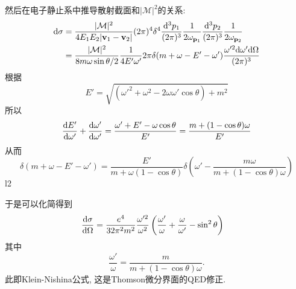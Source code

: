 \begin{example}[Campton散射]
    然后在电子静止系中推导散射截面和$|\mathcal M|^2$的关系:
    \begin{align}
        \d\sigma&=\frac{|\mathcal M|^2}{4E_1E_2|\vec v_1-\vec v_2|}\dpi4\delta^4\lips{p_1}\lips{p_2}\\
        &=\frac{|\mathcal M|^2}{8m\omega\sin\theta/2}\frac{1}{4E'\omega'}2\pi\delta(m+\omega-E'-\omega')\frac{\omega'^2\d\omega'\d\Omega}{\dpi3}
    \end{align}
    根据
    \begin{equation}
        E'=\sqrt{(\omega'^2+\omega^2-2\omega\omega'\cos\theta)+m^2}
    \end{equation}
    所以
    \begin{equation}
        \frac{\mathrm dE'}{\mathrm d\omega'}+\frac{\mathrm d\omega'}{\mathrm d\omega'}=\frac{\omega'+E'-\omega\cos\theta}{E'}=\frac{m+(1-\cos\theta)\omega}{E'}
    \end{equation}
    从而
    \begin{equation}
        \delta(m+\omega-E'-\omega')=\frac{E'}{m+\omega(1-\cos\theta)}\delta(\omega'-\frac{m\omega}{m+(1-\cos\theta)\omega})
    \end{equation}l2
     
    于是可以化简得到
    \begin{align}
        \frac{\mathrm d\sigma}{\mathrm d\Omega}&=\frac{e^4}{32\pi^2m^2}\frac{\omega'^2}{\omega^2}\left(\frac{\omega'}{\omega}+\frac{\omega}{\omega'}-\sin^2\theta\right)
    \end{align}
    其中
    \begin{equation}
        \frac{\omega'}{\omega}=\frac{m}{m+(1-\cos\theta)\omega}.
    \end{equation}
    此即Klein-Nishina公式, 这是Thomson微分界面的QED修正.
\end{example}
